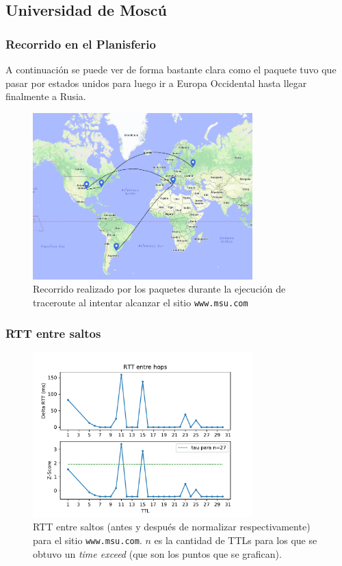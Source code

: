 \subsection*{Universidad de Moscú}

\subsubsection*{Recorrido en el Planisferio}

A continuación se puede ver de forma bastante clara como el paquete tuvo que pasar por estados unidos para luego ir a Europa Occidental hasta llegar finalmente a Rusia.

\begin{figure}[H]
  \centering
  \includegraphics[width=8.5cm]{figs/moscow.png}
  \caption{\footnotesize Recorrido realizado por los paquetes durante la ejecución de traceroute al intentar alcanzar el sitio \texttt{www.msu.com}}
\end{figure}

\subsubsection*{RTT entre saltos}

\begin{figure}[H]
  \centering
  \includegraphics[width=8.5cm]{figs/traceroute-moscow.pdf}
  \caption{\footnotesize RTT entre saltos (antes y después de normalizar respectivamente) para el sitio \texttt{www.msu.com}. $n$ es la cantidad de TTLs para los que se obtuvo un \emph{time exceed} (que son los puntos que se grafican).}
  \label{plot-moscow}
\end{figure}

